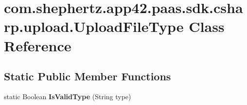\hypertarget{classcom_1_1shephertz_1_1app42_1_1paas_1_1sdk_1_1csharp_1_1upload_1_1_upload_file_type}{\section{com.\+shephertz.\+app42.\+paas.\+sdk.\+csharp.\+upload.\+Upload\+File\+Type Class Reference}
\label{classcom_1_1shephertz_1_1app42_1_1paas_1_1sdk_1_1csharp_1_1upload_1_1_upload_file_type}
}
\subsection*{Static Public Member Functions}
\begin{DoxyCompactItemize}
\item 
\hypertarget{classcom_1_1shephertz_1_1app42_1_1paas_1_1sdk_1_1csharp_1_1upload_1_1_upload_file_type_a3701589b6778974b6c5668a5f9b82dbf}{static Boolean {\bfseries Is\+Valid\+Type} (String type)}\label{classcom_1_1shephertz_1_1app42_1_1paas_1_1sdk_1_1csharp_1_1upload_1_1_upload_file_type_a3701589b6778974b6c5668a5f9b82dbf}

\end{DoxyCompactItemize}
